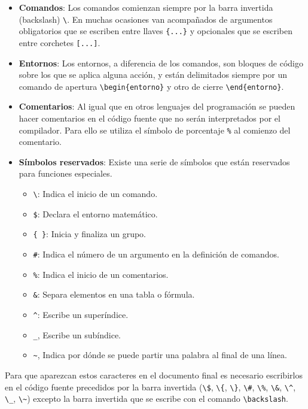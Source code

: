 \documentclass[
  spanish,
  a4paper,
]{scrreport}
\providecommand{\tightlist}{%
  \setlength{\itemsep}{0pt}\setlength{\parskip}{0pt}}
\theoremstyle{definition}
\theoremstyle{remark}
\begin{document}
\begin{itemize}
\item
  \textbf{Comandos}: Los comandos comienzan siempre por la barra
  invertida (backslash) \texttt{\textbackslash{}}. En muchas ocasiones
  van acompañados de argumentos obligatorios que se escriben entre
  llaves \texttt{\{...\}} y opcionales que se escriben entre corchetes
  \texttt{{[}...{]}}.
\item
  \textbf{Entornos}: Los entornos, a diferencia de los comandos, son
  bloques de código sobre los que se aplica alguna acción, y están
  delimitados siempre por un comando de apertura
  \texttt{\textbackslash{}begin\{entorno\}} y otro de cierre
  \texttt{\textbackslash{}end\{entorno\}}.
\item
  \textbf{Comentarios}: Al igual que en otros lenguajes del programación
  se pueden hacer comentarios en el código fuente que no serán
  interpretados por el compilador. Para ello se utiliza el símbolo de
  porcentaje \texttt{\%} al comienzo del comentario.
\item
  \textbf{Símbolos reservados}: Existe una serie de símbolos que están
  reservados para funciones especiales.

  \begin{itemize}
  \tightlist
  \item
    \texttt{\textbackslash{}}: Indica el inicio de un comando.
  \item
    \texttt{\$}: Declara el entorno matemático.
  \item
    \texttt{\{\ \}}: Inicia y finaliza un grupo.
  \item
    \texttt{\#}: Indica el número de un argumento en la definición de
    comandos.
  \item
    \texttt{\%}: Indica el inicio de un comentarios.
  \item
    \texttt{\&}: Separa elementos en una tabla o fórmula.
  \item
    \texttt{\^{}}: Escribe un superíndice.
  \item
    \texttt{\_}, Escribe un subíndice.
  \item
    \texttt{\textasciitilde{}}, Indica por dónde se puede partir una
    palabra al final de una línea.
  \end{itemize}
\end{itemize}

Para que aparezcan estos caracteres en el documento final es necesario
escribirlos en el código fuente precedidos por la barra invertida
(\texttt{\textbackslash{}\$}, \texttt{\textbackslash{}\{},
\texttt{\textbackslash{}\}}, \texttt{\textbackslash{}\#},
\texttt{\textbackslash{}\%}, \texttt{\textbackslash{}\&},
\texttt{\textbackslash{}\^{}}, \texttt{\textbackslash{}\_},
\texttt{\textbackslash{}\textasciitilde{}}) excepto la barra invertida
que se escribe con el comando \texttt{\textbackslash{}backslash}.
\end{document}
